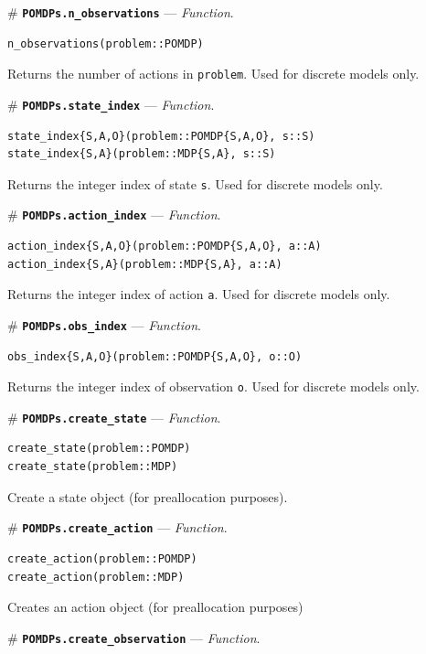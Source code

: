 \documentclass[12pt,]{article}
\begin{document}
\# \textbf{\texttt{POMDPs.n\_observations}} --- \emph{Function}.

\begin{verbatim}
n_observations(problem::POMDP)
\end{verbatim}

Returns the number of actions in \texttt{problem}. Used for discrete
models only.

\# \textbf{\texttt{POMDPs.state\_index}} --- \emph{Function}.

\begin{verbatim}
state_index{S,A,O}(problem::POMDP{S,A,O}, s::S)
state_index{S,A}(problem::MDP{S,A}, s::S)
\end{verbatim}

Returns the integer index of state \texttt{s}. Used for discrete models
only.

\# \textbf{\texttt{POMDPs.action\_index}} --- \emph{Function}.

\begin{verbatim}
action_index{S,A,O}(problem::POMDP{S,A,O}, a::A)
action_index{S,A}(problem::MDP{S,A}, a::A)
\end{verbatim}

Returns the integer index of action \texttt{a}. Used for discrete models
only.

\# \textbf{\texttt{POMDPs.obs\_index}} --- \emph{Function}.

\begin{verbatim}
obs_index{S,A,O}(problem::POMDP{S,A,O}, o::O)
\end{verbatim}

Returns the integer index of observation \texttt{o}. Used for discrete
models only.

\# \textbf{\texttt{POMDPs.create\_state}} --- \emph{Function}.

\begin{verbatim}
create_state(problem::POMDP)
create_state(problem::MDP)
\end{verbatim}

Create a state object (for preallocation purposes).

\# \textbf{\texttt{POMDPs.create\_action}} --- \emph{Function}.

\begin{verbatim}
create_action(problem::POMDP)
create_action(problem::MDP)
\end{verbatim}

Creates an action object (for preallocation purposes)

\# \textbf{\texttt{POMDPs.create\_observation}} --- \emph{Function}.
\end{document}
